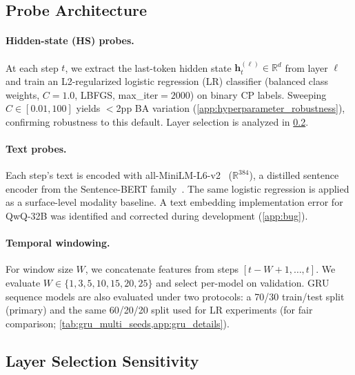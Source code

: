 \subsection{Probe Architecture}
\label{sec:probe-architecture}

\paragraph{Hidden-state (HS) probes.} At each step $t$, we extract the last-token hidden state $\mathbf{h}_t^{(\ell)} \in \mathbb{R}^d$ from layer $\ell$ and train an L2-regularized logistic regression (LR) classifier (balanced class weights, $C{=}1.0$, LBFGS, max\_iter${}=2000$) on binary CP labels. Sweeping $C \in [0.01, 100]$ yields $<$2pp BA variation (\cref{app:hyperparameter_robustness}), confirming robustness to this default. Layer selection is analyzed in \cref{sec:layer-sensitivity}.

\paragraph{Text probes.} Each step's text is encoded with all-MiniLM-L6-v2~\citep{wang2020minilm} ($\mathbb{R}^{384}$), a distilled sentence encoder from the Sentence-BERT family~\citep{reimers2019sentence}. The same logistic regression is applied as a surface-level modality baseline. A text embedding implementation error for QwQ-32B was identified and corrected during development (\cref{app:bug}).

\paragraph{Temporal windowing.} For window size $W$, we concatenate features from steps $[t{-}W{+}1, \ldots, t]$. We evaluate $W \in \{1, 3, 5, 10, 15, 20, 25\}$ and select per-model on validation. GRU sequence models are also evaluated under two protocols: a 70/30 train/test split (primary) and the same 60/20/20 split used for LR experiments (for fair comparison; \cref{tab:gru_multi_seeds,app:gru_details}).

\subsection{Layer Selection Sensitivity}
\label{sec:layer-sensitivity}

